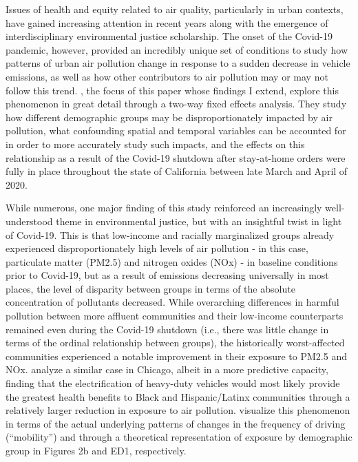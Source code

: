 \documentclass[12pt, ]{article}
\begin{document}
Issues of health and equity related to air quality, particularly in
urban contexts, have gained increasing attention in recent years along
with the emergence of interdisciplinary environmental justice
scholarship. The onset of the Covid-19 pandemic, however, provided an
incredibly unique set of conditions to study how patterns of urban air
pollution change in response to a sudden decrease in vehicle emissions,
as well as how other contributors to air pollution may or may not follow
this trend. \citet{bluhm_disparate_2022}, the focus of this paper whose
findings I extend, explore this phenomenon in great detail through a
two-way fixed effects analysis. They study how different demographic
groups may be disproportionately impacted by air pollution, what
confounding spatial and temporal variables can be accounted for in order
to more accurately study such impacts, and the effects on this
relationship as a result of the Covid-19 shutdown after stay-at-home
orders were fully in place throughout the state of California between
late March and April of 2020.

While numerous, one major finding of this study reinforced an
increasingly well-understood theme in environmental justice, but with an
insightful twist in light of Covid-19. This is that low-income and
racially marginalized groups already experienced disproportionately high
levels of air pollution - in this case, particulate matter (PM2.5) and
nitrogen oxides (NOx) - in baseline conditions prior to Covid-19, but as
a result of emissions decreasing universally in most places, the level
of disparity between groups in terms of the absolute concentration of
pollutants decreased. While overarching differences in harmful pollution
between more affluent communities and their low-income counterparts
remained even during the Covid-19 shutdown (i.e., there was little
change in terms of the ordinal relationship between groups), the
historically worst-affected communities experienced a notable
improvement in their exposure to PM2.5 and NOx.
\citet{camilleri_air_2023} analyze a similar case in Chicago, albeit in
a more predictive capacity, finding that the electrification of
heavy-duty vehicles would most likely provide the greatest health
benefits to Black and Hispanic/Latinx communities through a relatively
larger reduction in exposure to air pollution.
\citet{bluhm_disparate_2022} visualize this phenomenon in terms of the
actual underlying patterns of changes in the frequency of driving
(``mobility'') and through a theoretical representation of exposure by
demographic group in Figures 2b and ED1, respectively.
\end{document}
